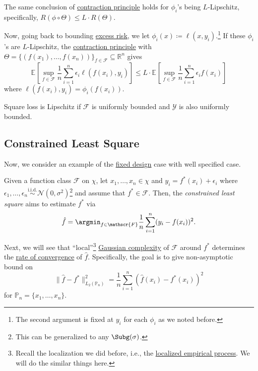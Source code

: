 \begin{corollary}\label{col:contraction-principle}
	The same conclusion of \hyperref[thm:contraction-principle]{contraction principle} holds for \(\phi _i\)'s being \(L\)-Lipschitz, specifically, \(R(\phi \circ \Theta ) \leq L\cdot R(\Theta )\).
\end{corollary}

Now, going back to bounding \hyperref[not:excess-risk]{excess risk}, we let \(\phi _i (x) \coloneqq \ell (x, y_i)\).\footnote{The second argument is fixed at \(y_i\) for each \(\phi _i\) as we noted before.} If these \(\phi _i\)'s are \(L\)-Lipschitz, the \hyperref[col:contraction-principle]{contraction principle} with \(\Theta = \{ (f(x_1), \dots , f(x_n)) \} _{f\in \mathscr{F} } \subseteq \mathbb{R} ^n \) gives
\[
	\mathbb{E}_{}\left[\sup _{f\in \mathscr{F} } \frac{1}{n} \sum_{i=1}^{n} \epsilon _i \ell (f(x_i), y_i) \right]
	\leq L\cdot \mathbb{E}_{}\left[\sup _{f\in \mathscr{F} } \frac{1}{n} \sum_{i=1}^{n} \epsilon _i f(x_i) \right]
\]
where \(\ell (f(x_i), y_i) = \phi _i(f(x_i))\).

\begin{eg}
	Square loss is Lipschitz if \(\mathscr{F} \) is uniformly bounded and \(\mathscr{Y} \) is also uniformly bounded.
\end{eg}

\subsection{Constrained Least Square}
Now, we consider an example of the \hyperref[prb:fixed-design-non-parametric-LS]{fixed design} case with well specified case.

\begin{problem}\label{prb:constrained-least-square}
Given a function class \(\mathscr{F} \) on \(\chi \), let \(x_1, \dots , x_n \in \chi \) and \(y_i = f^{\ast} (x_i) + \epsilon _i\) where \(\epsilon _1, \dots , \epsilon _n \overset{\text{i.i.d.} }{\sim } \mathcal{N} (0, \sigma ^2) \)\footnote{This can be generalized to any \(\Subg(\sigma )\).} and assume that \(f^{\ast} \in \mathscr{F} \). Then, the \emph{constrained least square} aims to estimate \(f^{\ast} \) via
\[
	\hat{f} = \argmin_{f\in\mathscr{F} } \frac{1}{n} \sum_{i=1}^{n} (y_i - f(x_i))^2.
\]
\end{problem}

Next, we will see that ``local''\footnote{Recall the localization we did before, i.e., the \hyperref[def:localized-EP]{localized empirical process}. We will do the similar things here.} \hyperref[def:Gaussian-width]{Gaussian complexity} of \(\mathscr{F} \) around \(f^{\ast} \) determines the \hyperref[def:rate-of-convergence]{rate of convergence} of \(\hat{f} \). Specifically, the goal is to give non-asymptotic bound on
\[
	\lVert \hat{f} - f^{\ast} \rVert ^2 _{L_2(\mathbb{P} _n)}
	= \frac{1}{n} \sum_{i=1}^{n} \left( \hat{f} (x_i) - f^{\ast} (x_i) \right) ^2
\]
for \(\mathbb{P} _n = \{ x_1, \dots , x_n \} \).


